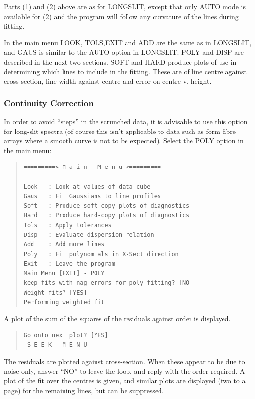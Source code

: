 Parts (1) and (2) above are as for LONGSLIT, except that only AUTO
mode is available for (2) and the program will follow any curvature
of the lines during fitting.

In the main menu LOOK, TOLS,EXIT and ADD are the same as in LONGSLIT,
and GAUS is similar to the AUTO option in LONGSLIT. POLY and DISP are
described in the next two sections. SOFT and HARD produce plots of use
in determining which lines to include in the fitting. These are of line
centre against cross-section, line width against centre and error on
centre v. height.

\subsubsection{Continuity Correction}
\label{arc2d.continuity}

In order to avoid ``steps'' in the scrunched data, it is advisable to
use this option for long-slit spectra (of course this isn't applicable
to data such as form fibre arrays where a smooth curve is not to be
expected).
Select the POLY option in the main menu:
 
\begin{quote}\begin{verbatim}
=========< M a i n   M e n u >=========
 
Look   : Look at values of data cube
Gaus   : Fit Gaussians to line profiles
Soft   : Produce soft-copy plots of diagnostics
Hard   : Produce hard-copy plots of diagnostics
Tols   : Apply tolerances
Disp   : Evaluate dispersion relation
Add    : Add more lines
Poly   : Fit polynomials in X-Sect direction
Exit   : Leave the program
Main Menu [EXIT] - POLY
keep fits with nag errors for poly fitting? [NO]
Weight fits? [YES]
Performing weighted fit
\end{verbatim}\end{quote}

A plot of the sum of the squares of the residuals against order is
displayed.

\begin{quote}\begin{verbatim}
Go onto next plot? [YES]
 S E E K   M E N U
\end{verbatim}\end{quote}

The residuals are plotted against cross-section. When these appear to
be due to noise only, answer ``NO'' to leave the loop, and reply with
the order required. A plot of the fit over the centres is given, and
similar plots are displayed (two to a page) for the remaining lines,
but can be suppressed.

